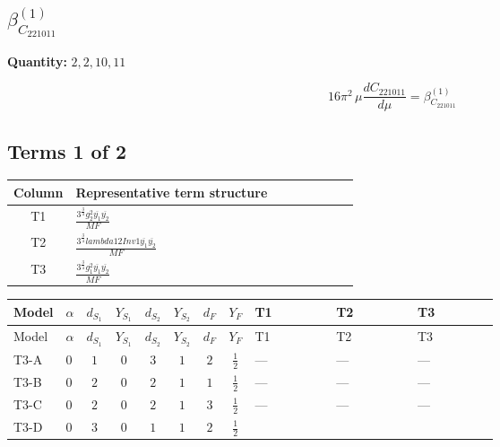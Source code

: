 \documentclass[8pt]{article}
\begin{document}
\begin{landscape}
\section*{$\beta_{C_{221011}}^{(1)}$}
\noindent\textbf{Quantity: }$\mathrm{2,2,10,11}$\par\smallskip
\[16\pi^2\,\mu\frac{d C_{221011}}{d\mu}=\beta_{C_{221011}}^{(1)}\]
\subsection*{Terms 1 of 2}
\begin{center}
\begin{tabular}{@{}c >{\raggedright\arraybackslash}p{0.82\linewidth}@{}}
\toprule
Column & Representative term structure \\
\midrule
T1 & \(\displaystyle \frac{3^{\frac{3}{4}} g_{2}^{2} \overline{y_{1}} \overline{y_{2}}}{MF}\) \\
\midrule
T2 & \(\displaystyle \frac{3^{\frac{3}{4}} lambda12Inv1 \overline{y_{1}} \overline{y_{2}}}{MF}\) \\
\midrule
T3 & \(\displaystyle \frac{3^{\frac{3}{4}} g_{1}^{2} \overline{y_{1}} \overline{y_{2}}}{MF}\) \\
\midrule
\bottomrule
\end{tabular}
\end{center}
\smallskip
\tiny
\begin{longtable}{@{}llcccccc >{\raggedright\arraybackslash}p{0.21\linewidth} >{\raggedright\arraybackslash}p{0.21\linewidth} >{\raggedright\arraybackslash}p{0.21\linewidth}@{}}
\toprule
Model & $\alpha$ & $d_{S_1}$ & $Y_{S_1}$ & $d_{S_2}$ & $Y_{S_2}$ & $d_F$ & $Y_F$ & T1 & T2 & T3 \\
\midrule
\endfirsthead
\toprule
Model & $\alpha$ & $d_{S_1}$ & $Y_{S_1}$ & $d_{S_2}$ & $Y_{S_2}$ & $d_F$ & $Y_F$ & T1 & T2 & T3 \\
\midrule
\endhead
T3-A & $0$ & $1$ & $0$ & $3$ & $1$ & $2$ & $\frac{1}{2}$ & --- & --- & --- \\
\midrule
T3-B & $0$ & $2$ & $0$ & $2$ & $1$ & $1$ & $\frac{1}{2}$ & --- & --- & --- \\
\midrule
T3-C & $0$ & $2$ & $0$ & $2$ & $1$ & $3$ & $\frac{1}{2}$ & --- & --- & --- \\
\midrule
T3-D & $0$ & $3$ & $0$ & $1$ & $1$ & $2$ & $\frac{1}{2}$ & \scriptsize\adjustbox{max width=\linewidth}{$\begin{gathered} - \frac{17 \cdot 3^{\frac{3}{4}} g_{2}^{2} \overline{y_{1}} \overline{y_{2}}}{24 MF}\end{gathered}$} & \scriptsize\adjustbox{max width=\linewidth}{$\begin{gathered} - \frac{3^{\frac{3}{4}} lambda12Inv1 \overline{y_{1}} \overline{y_{2}}}{6 MF}\end{gathered}$} & \scriptsize\adjustbox{max width=\linewidth}{$\begin{gathered} - \frac{3^{\frac{3}{4}} g_{1}^{2} \overline{y_{1}} \overline{y_{2}}}{8 MF}\end{gathered}$} \\

\end{longtable}
\end{landscape}
\end{document}

